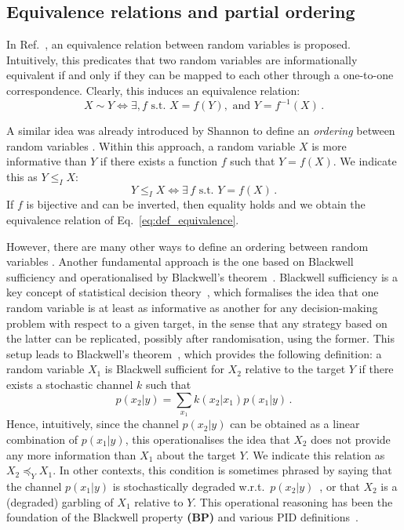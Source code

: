 \documentclass{article}
\newcommand{\BP}{\textbf{(BP)}\xspace} %
\begin{document}
\subsection{Equivalence relations and partial ordering}

In Ref.~\cite{li2011connection}, an equivalence relation between random variables is proposed. Intuitively, this predicates that two random variables are informationally equivalent if and only if they can be mapped to each other through a one-to-one correspondence. Clearly, this induces an equivalence relation:
\begin{equation} \label{eq:def_equivalence}
    X\sim Y  \iff \exists, f \text{ s.t. } X=f(Y), \text{ and } Y=f^{-1}(X)\,.
\end{equation}

A similar idea was already introduced by Shannon to define an \textit{ordering} between random variables \cite{shannon1953lattice}. 
Within this approach, a random variable $X$ is more informative than $Y$ if there exists a function $f$ such that $Y=f(X)$. We indicate this as $Y\leq_I X$:
\begin{equation}
    Y\leq_I X\iff \exists\, f \text{ s.t. } Y=f(X) \,.
\end{equation}
If $f$ is bijective and can be inverted, then equality holds and we obtain the equivalence relation of Eq.~\eqref{eq:def_equivalence}. 

However, there are many other ways to define an ordering between random variables \cite{gacs1973common, griffith2015quantifying, aumann2016agreeing}.
Another fundamental approach is the one based on Blackwell sufficiency and operationalised by Blackwell's theorem~\cite{blackwell1953equivalent}. 
Blackwell sufficiency is a key concept of statistical decision theory~\cite{blackwell1953equivalent, torgersen1991comparison}, which formalises the idea that one random variable is at least as informative as another for any decision-making problem with respect to a given target, in the sense that any strategy based on the latter can be replicated, possibly after randomisation, using the former. 
This setup leads to Blackwell’s theorem~\cite{blackwell1953equivalent, rauh2017coarse}, which provides the following definition: a random variable $X_1$ is Blackwell sufficient for $X_2$ relative to the target $Y$ if there exists a stochastic channel $k$ such that
\begin{equation} \label{eq:def_blackwell}
    p(x_2|y) = \sum_{x_1} k(x_2|x_1) p(x_1|y) \,.
\end{equation}
Hence, intuitively, since the channel $p(x_2|y)$ can be obtained as a linear combination of $p(x_1|y)$, this operationalises the idea that $X_2$ does not provide any more information than $X_1$ about the target $Y$. We indicate this relation as $X_2\preceq_Y X_1$.
In other contexts, this condition is sometimes phrased by saying that the channel $p(x_1|y)$ is stochastically degraded w.r.t.\ $p(x_2|y)$~\cite{venkatesh2022partial}, or that $X_2$ is a (degraded) garbling of $X_1$ relative to $Y$. 
This operational reasoning has been the foundation of the Blackwell property \BP and various PID definitions~\cite{bertschinger2014quantifying, rauh2017extractable, venkatesh2022partial, kolchinsky2022novel, mages2023decomposing}.
\end{document}
